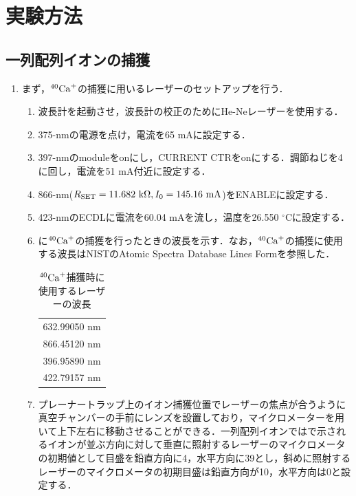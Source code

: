 \chapter{実験方法}\label{method}
\section{一列配列イオンの捕獲}
\begin{enumerate}
\item まず，$^{40}{\rm Ca}^+$の捕獲に用いるレーザーのセットアップを行う．
\begin{enumerate}
\item 波長計を起動させ，波長計の校正のためにHe-Neレーザーを使用する．
\item 375-nmの電源を点け，電流を65 mAに設定する．
\item 397-nmのmoduleをonにし，CURRENT CTRをonにする．調節ねじを4に回し，電流を51 mA付近に設定する．
\item 866-nm($R_{\rm SET} = 11.682 \ {\rm k}\Omega , I_{0} = 145.16 \ {\rm mA}$)をENABLEに設定する．
\item 423-nmのECDLに電流を60.04 mAを流し，温度を26.550 $^{\circ}$Cに設定する．
\item {}に$^{40}{\rm Ca}^+$の捕獲を行ったときの波長を示す．なお，$^{40}{\rm Ca}^+$の捕獲に使用する波長はNISTのAtomic Spectra Database Lines Form\cite{NIST}を参照した．

\begin{table}[h]
	\centering
		\caption{$^{40}{\rm Ca}^+$捕獲時に使用するレーザーの波長}
		\label{tab:use_laser_wavelength}
		\begin{tabular}{c}\hline \hline
			632.99050 nm \\
			866.45120 nm \\
			396.95890 nm \\
			422.79157 nm \\ \hline
		\end{tabular}
\end{table}

\item プレーナートラップ上のイオン捕獲位置でレーザーの焦点が合うように真空チャンバーの手前にレンズを設置しており，マイクロメーターを用いて上下左右に移動させることができる．一列配列イオンではで示されるイオンが並ぶ方向に対して垂直に照射するレーザーのマイクロメータの初期値として目盛を鉛直方向に4，水平方向に39とし，斜めに照射するレーザーのマイクロメータの初期目盛は鉛直方向が10，水平方向は0と設定する．


\end{enumerate}
\end{enumerate}
